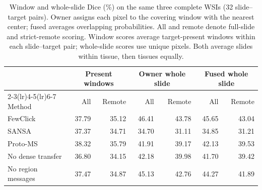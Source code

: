 \begin{table}[t]
\centering
\caption{Window and whole-slide Dice (\%) on the same three complete WSIs (32 slide--target pairs). Owner assigns each pixel to the covering window with the nearest center; fused averages overlapping probabilities. All and remote denote full-slide and strict-remote scoring. Window scores average target-present windows within each slide--target pair; whole-slide scores use unique pixels. Both average slides within tissue, then tissues equally.}
\label{tab:wsi_readouts}
\small\setlength{\tabcolsep}{8pt}
\begin{tabular}{@{}lrrrrrr@{}}
\toprule
& \multicolumn{2}{c}{Present windows} & \multicolumn{2}{c}{Owner whole slide} & \multicolumn{2}{c}{Fused whole slide} \\
\cmidrule(lr){2-3}\cmidrule(lr){4-5}\cmidrule(lr){6-7}
Method & All & Remote & All & Remote & All & Remote \\
\midrule
FewClick & 37.79 & 35.12 & 46.41 & 43.78 & 45.65 & 43.04 \\
SANSA & 37.37 & 34.71 & 34.70 & 31.11 & 34.85 & 31.21 \\
Proto-MS & 38.32 & 35.79 & 41.91 & 39.17 & 42.13 & 39.53 \\
No dense transfer & 36.80 & 34.15 & 42.18 & 39.98 & 41.70 & 39.42 \\
No region messages & 37.47 & 34.87 & 45.13 & 42.76 & 44.27 & 41.89 \\
\bottomrule
\end{tabular}
\end{table}
